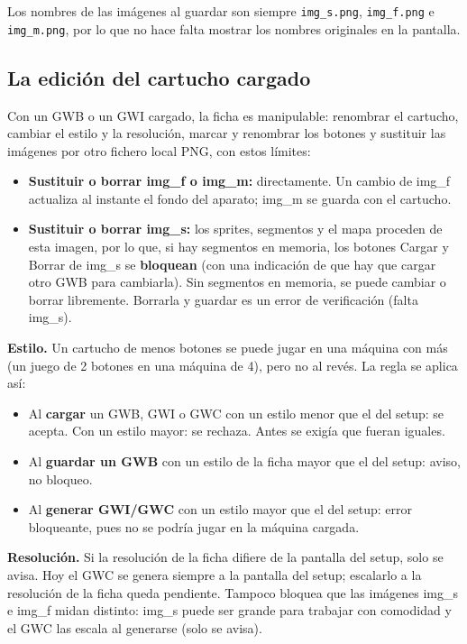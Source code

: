 Los nombres de las imágenes al guardar son siempre \texttt{img\_s.png}, \texttt{img\_f.png} e \texttt{img\_m.png}, por lo que no hace falta mostrar los nombres originales en la pantalla.

\subsection{La edición del cartucho cargado}
\label{sec:F5I10Edicion}

Con un GWB o un GWI cargado, la ficha es manipulable: renombrar el cartucho,
cambiar el estilo y la resolución, marcar y renombrar los botones y sustituir las imágenes 
por otro fichero local PNG, con estos límites:

\begin{itemize}
	\item \textbf{Sustituir o borrar img\_f o img\_m:} directamente. Un cambio de img\_f actualiza al instante el fondo del aparato; img\_m se guarda con el cartucho.
	\item \textbf{Sustituir o borrar img\_s:} los sprites, segmentos y el mapa proceden de esta imagen, por lo que, si hay segmentos en memoria, los botones Cargar y Borrar de img\_s se \textbf{bloquean} (con una indicación de que hay que cargar otro GWB para cambiarla). Sin segmentos en memoria, se puede cambiar o borrar libremente. Borrarla y guardar es un error de verificación (falta img\_s).
\end{itemize}

\textbf{Estilo.} Un cartucho de menos botones se puede jugar en una máquina con más (un juego de 2 botones en una máquina de 4), pero no al revés. La regla se aplica así:
\begin{itemize}
	\item Al \textbf{cargar} un GWB, GWI o GWC con un estilo menor que el del setup: se acepta. Con un estilo mayor: se rechaza. Antes se exigía que fueran iguales.
	\item Al \textbf{guardar un GWB} con un estilo de la ficha mayor que el del setup: aviso, no bloqueo.
	\item Al \textbf{generar GWI/GWC} con un estilo mayor que el del setup: error bloqueante, pues no se podría jugar en la máquina cargada.
\end{itemize}

\textbf{Resolución.} Si la resolución de la ficha difiere de la pantalla del setup, solo se avisa. Hoy el GWC se genera siempre a la pantalla del setup; escalarlo a la resolución de la ficha queda pendiente. Tampoco bloquea que las imágenes img\_s e img\_f midan distinto: img\_s puede ser grande para trabajar con comodidad y el GWC las escala al generarse (solo se avisa).

